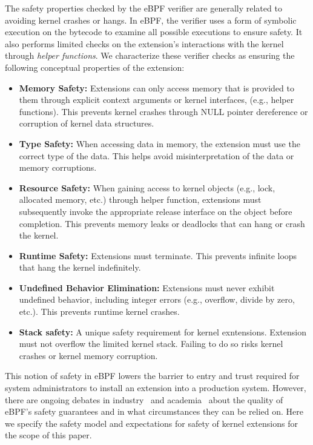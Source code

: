 The safety properties checked by the eBPF verifier are generally
related to avoiding kernel crashes or hangs.  In eBPF, the verifier
uses a form of symbolic execution on the bytecode to examine all
possible executions to ensure safety.  It also performs limited
checks on the extension's
interactions with the kernel through {\em
  helper functions}.
We characterize these verifier
checks as ensuring the following conceptual properties of the
extension:
\begin{itemize}
\item {\bf Memory Safety:} Extensions can only access memory that is
  provided to them through explicit context arguments or kernel
  interfaces, (e.g., helper functions).  This prevents kernel crashes
  through NULL pointer dereference or corruption of kernel data
  structures.
\item {\bf Type Safety:} When accessing data in memory, the extension must use
  the correct type of the data. This helps avoid misinterpretation of the data
  or memory corruptions.
\item {\bf Resource Safety:} When gaining access to kernel objects
  (e.g., lock, allocated memory, etc.) through helper function,
  extensions must subsequently invoke the appropriate release
  interface on the object before completion.  This prevents memory
  leaks or deadlocks that can hang or crash the kernel.
\item {\bf Runtime Safety:} Extensions must terminate. This prevents
  infinite loops that hang the kernel indefinitely.
\item {\bf Undefined Behavior Elimination:} Extensions must never
  exhibit undefined behavior, including integer errors (e.g.,
  overflow, divide by zero, etc.). This prevents runtime kernel
  crashes.
\item {\bf Stack safety:} A unique safety requirement for kernel exntensions.
  Extension must not overflow the limited kernel stack.
  Failing to do so risks kernel crashes or kernel memory corruption.
\end{itemize}

This notion of safety in eBPF lowers the barrier to entry and trust
required for system administrators to install an extension into a
production system.  However, there are ongoing debates in
industry~\cite{reconsider-unpriv-ebpf-lwn,seccomp-ebpf-lwn,ebpf-sec-lwn} and
academia~\cite{untenableVerification} about the quality of eBPF's
safety guarantees and in what circumstances they can be relied on.
Here we specify the safety model and expectations for safety of kernel
extensions for the scope of this paper.

